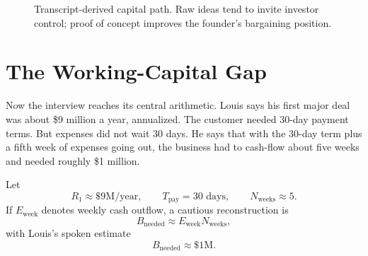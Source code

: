 \begin{figure}
\centering
{}
\caption{Transcript-derived capital path. Raw ideas tend to invite investor control; proof of concept improves the founder's bargaining position.}
\end{figure}

\section{The Working-Capital Gap}

Now the interview reaches its central arithmetic. Louis says his first major deal was about \$9 million a year, annualized. The customer needed 30-day payment terms. But expenses did not wait 30 days. He says that with the 30-day term plus a fifth week of expenses going out, the business had to cash-flow about five weeks and needed roughly \$1 million.

Let
\[
R_1 \approx \$9\text{M/year},
\qquad
T_{\mathrm{pay}} = 30\text{ days},
\qquad
N_{\mathrm{weeks}} \approx 5.
\]
If \(E_{\mathrm{week}}\) denotes weekly cash outflow, a cautious reconstruction is
\begin{equation}
B_{\mathrm{needed}} \approx E_{\mathrm{week}}N_{\mathrm{weeks}},
\end{equation}
with Louis's spoken estimate
\begin{equation}
B_{\mathrm{needed}} \approx \$1\text{M}.
\end{equation}

